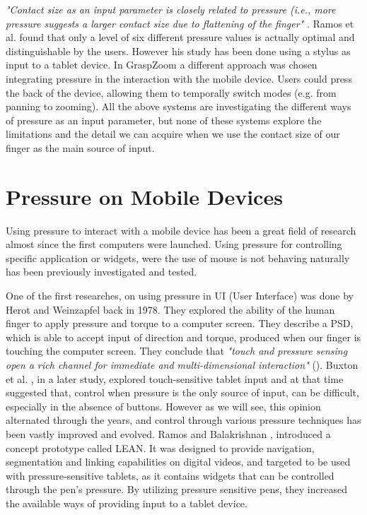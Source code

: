 \emph{"Contact size as an input parameter is closely related to pressure (i.e., more pressure suggests a larger contact size due to flattening of the finger"} \textbf{\cite{Boring:2012:FTU:2371574.2371582}}. Ramos et al. \cite{Ramos2004} found that only a level of six different pressure values is actually optimal and distinguishable by the users. However his study has been done using a stylus as input to a tablet device. In GraspZoom \cite{Miyaki:2009:GZS:1613858.1613872} a different approach was chosen integrating pressure in the interaction with the mobile device. Users could press the back of the device, allowing them to temporally switch modes (e.g. from panning to zooming). All the above systems are investigating the different ways of pressure as an input parameter, but none of these systems explore the limitations and the detail we can acquire when we use the contact size of our finger as the main source of input.


\section{Pressure on Mobile Devices}
\label{sec:pressureMobileDevices}

Using pressure to interact with a mobile device has been a great field of research almost since the first computers were launched. Using pressure for controlling specific application or widgets, were the use of mouse is not behaving naturally has been previously investigated and tested.

One of the first researches, on using pressure in UI (User Interface) was done by Herot and Weinzapfel \cite{Herot:1978:OTI:965139.807392} back in 1978. They explored the ability of the human finger to apply pressure and torque to a computer screen. They describe a PSD, which is able to accept input of direction and torque, produced when our finger is touching the computer screen. They conclude that \emph{"touch and pressure sensing open a rich channel for immediate and multi-dimensional interaction"} (\cite{Herot:1978:OTI:965139.807392}).
Buxton et al. \cite{Buxton:1985:ITT:325165.325239}, in a later study, explored touch-sensitive tablet input and at that time suggested that, control when pressure is the only source of input, can be difficult, especially in the absence of buttons. However as we will see, this opinion alternated through the years, and control through various pressure techniques has been vastly improved and evolved.
Ramos and Balakrishnan \cite{Ramos:2003:FIT:964696.964708}, introduced a concept prototype called LEAN. It was designed to provide navigation, segmentation and linking capabilities on digital videos, and targeted to be used with pressure-sensitive tablets, as it contains widgets that can be controlled through the pen's pressure. By utilizing pressure sensitive pens, they increased the available ways of providing input to a tablet device.

